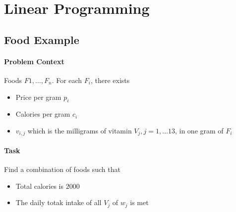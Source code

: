 \section{Linear Programming}

\subsection{Food Example}
\paragraph{Problem Context}
Foods \(F1, \ldots, F_n\). For each \(F_i\), there exists
 \begin{itemize}
   \item Price per gram \(p_i\) 
   \item Calories per gram \(c_i\)
   \item \(v_{i, j}\) which is the milligrams of vitamin
     \(V_j, j = 1, \ldots 13\), in one gram of \(F_i\) 
\end{itemize}

\paragraph{Task}
Find a combination of foods such that
\begin{itemize}
  \item Total calories is \(2000\)
  \item The daily totak intake of all \(V_j\) of  \(w_j\) is met
\end{itemize}



